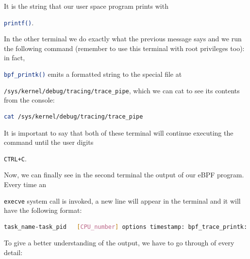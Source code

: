 It is the string that our user space program prints with \raggedright\colorbox{backcolour}{\lstinline[style=commandline, language=bash]|printf()|}. 

In the other terminal we do exactly what the previous message says and we run the following command (remember to use this terminal with root privileges too): in fact, \raggedright\colorbox{backcolour}{\lstinline[style=commandline, language=bash]|bpf_printk()|} emits a formatted string to the special file at \raggedright\colorbox{backcolour}{\lstinline[style=commandline, language=bash]|/sys/kernel/debug/tracing/trace_pipe|}, which we can cat to see its contents from the console:

\begin{lstlisting}[style=commandline, language=bash, caption={Command to start tracing the debug messages in libbpf-bootstrap.}]
	cat /sys/kernel/debug/tracing/trace_pipe
\end{lstlisting}

It is important to say that both of these terminal will continue executing the command until the user digits \raggedright\colorbox{backcolour}{\lstinline[style=commandline, language=bash]|CTRL+C|}.

Now, we can finally see in the second terminal the output of our eBPF program.
Every time an \raggedright\colorbox{backcolour}{\lstinline[style=commandline, language=bash]|execve|} system call is invoked, a new line will appear in the terminal and it will have the following format:

\begin{lstlisting}[style=commandline, language=bash, caption={\colorbox{backcolour}{\lstinline[style=commandline, language=bash]|bpf_printk()|} output message format in libbpf-bootstrap.}]
	task_name-task_pid   [CPU_number] options timestamp: bpf_trace_printk: invoke bpf_prog: Hello, World!
\end{lstlisting}

To give a better understanding of the output, we have to go through of every detail:

